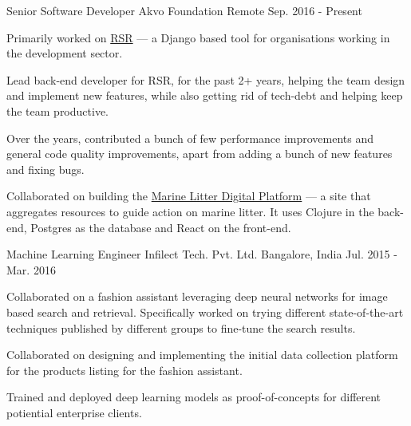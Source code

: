 

\begin{cventries}

  \cventry
      {Senior Software Developer} %
      {Akvo Foundation } %
      {Remote} %
      {Sep. 2016 - Present} %
      {
        \begin{cvitems} %
        \item {Primarily worked on \href{https://github.com/akvo/akvo-rsr}{RSR} --- a Django based tool for organisations working in the development sector.}
        \item {Lead back-end developer for RSR, for the past 2+ years, helping the team design and implement new features, while also getting rid of tech-debt and helping keep the team productive.}
        \item {Over the years, contributed a bunch of few performance improvements and general code quality improvements, apart from adding a bunch of new features and fixing bugs.}
        \item {Collaborated on building the \href{https://digital.gpmarinelitter.org/}{Marine Litter Digital Platform} --- a site that aggregates resources to guide action on marine litter. It uses Clojure in the back-end, Postgres as the database and React on the front-end.}
        \end{cvitems}
      }

  \cventry
    {Machine Learning Engineer} %
    {Infilect Tech. Pvt. Ltd. } %
    {Bangalore, India} %
    {Jul. 2015 - Mar. 2016} %
    {
      \begin{cvitems} %
      \item{Collaborated on a fashion assistant leveraging deep neural networks for image based search and retrieval. Specifically worked on trying different state-of-the-art techniques published by different groups to fine-tune the search results.}
        \item{Collaborated on designing and implementing the initial data collection platform for the products listing for the fashion assistant.}
        \item{Trained and deployed deep learning models as proof-of-concepts for different potiential enterprise clients.}
      \end{cvitems}
    }


\end{cventries}
